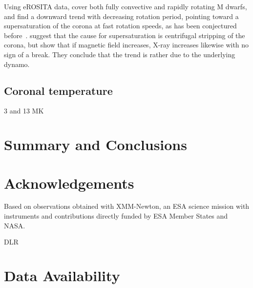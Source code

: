 \documentclass[twocolumn]{aastex631}
\begin{document}
Using eROSITA data, \citet{magaudda2022first} cover both fully convective and rapidly rotating M dwarfs, and find a downward trend with decreasing rotation period, pointing toward a supersaturation of the corona at fast rotation speeds, as has been conjectured before~\citep{jeffries2011investigating,ramsay2020tess}. \citet{jeffries2011investigating} suggest that the cause for supersaturation is centrifugal stripping of the corona, but \citet{reiners2022magnetism} show that if magnetic field increases, X-ray increases likewise with no sign of a break. They conclude that the trend is rather due to the underlying dynamo.

\cite{brown2023coronal}

\cite{johnstone2012soft}


\subsection{Coronal temperature}
\label{sec:discussion:xraytemp}

3 and 13 MK




\section{Summary and Conclusions}


\section*{Acknowledgements}
\citep{lightkurvecollaboration2018lightkurve}
Based on observations obtained with XMM-Newton, an ESA science mission with instruments and contributions directly funded by ESA Member States and NASA.

DLR
\section*{Data Availability}



\end{document}
